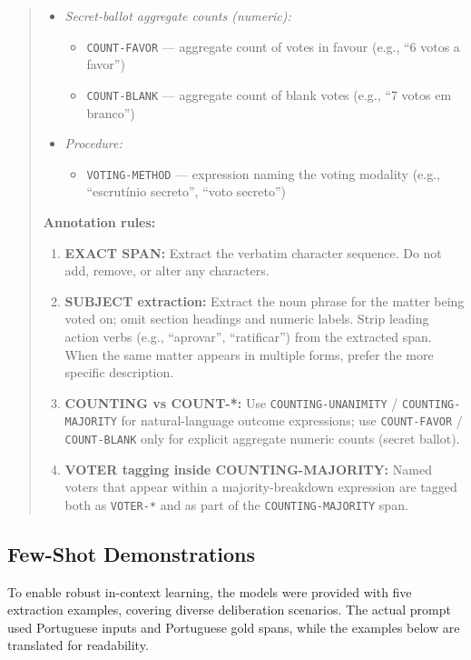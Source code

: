 \documentclass[11pt]{article}
\begin{document}
\begin{quote}
\begin{itemize}
    \item \textit{Secret-ballot aggregate counts (numeric):}
    \begin{itemize}
        \item \texttt{COUNT-FAVOR} — aggregate count of votes in favour (e.g., ``6 votos a favor'')
        \item \texttt{COUNT-BLANK} — aggregate count of blank votes (e.g., ``7 votos em branco'')
    \end{itemize}
    
    \item \textit{Procedure:}
    \begin{itemize}
        \item \texttt{VOTING-METHOD} — expression naming the voting modality (e.g., ``escrutínio secreto'', ``voto secreto'')
    \end{itemize}
\end{itemize}

\textbf{Annotation rules:}
\begin{enumerate}
    \item \textbf{EXACT SPAN:} Extract the verbatim character sequence. Do not add, remove, or alter any characters.
    \item \textbf{SUBJECT extraction:} Extract the noun phrase for the matter being voted on; omit section headings and numeric labels. Strip leading action verbs (e.g., ``aprovar'', ``ratificar'') from the extracted span. When the same matter appears in multiple forms, prefer the more specific description.
    \item \textbf{COUNTING vs COUNT-*:} Use \texttt{COUNTING-UNANIMITY} / \texttt{COUNTING-MAJORITY} for natural-language outcome expressions; use \texttt{COUNT-FAVOR} / \texttt{COUNT-BLANK} only for explicit aggregate numeric counts (secret ballot).
    \item \textbf{VOTER tagging inside COUNTING-MAJORITY:} Named voters that appear within a majority-breakdown expression are tagged both as \texttt{VOTER-*} and as part of the \texttt{COUNTING-MAJORITY} span.
\end{enumerate}
\end{quote}


\subsection{Few-Shot Demonstrations}
To enable robust in-context learning, the models were provided with five extraction examples, covering diverse deliberation scenarios. The actual prompt used Portuguese inputs and Portuguese gold spans, while the examples below are translated for readability.
\end{document}

